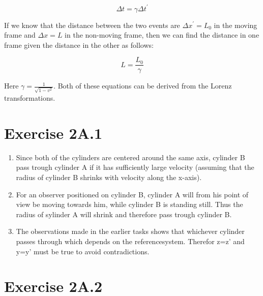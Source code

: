 \documentclass[a4paper,10pt,english]{article}
\begin{document}
\begin{equation}\label{eq:time_dila}
\Delta t=\gamma\Delta t^{\prime}
\end{equation}

If we know that the distance between the two events are $\Delta x^{\prime}=L_{0}$ in the moving frame and $\Delta x=L$ in the non-moving frame, then we can find the distance in one frame given the distance in the other as follows:

\begin{equation}\label{eq:len_con}
L=\frac{L_{0}}{\gamma}
\end{equation}

Here $\gamma=\frac{1}{\sqrt{1-v^{2}}}$. Both of these equations can be derived from the Lorenz transformations.

\newpage
%
%
%
%
%
%
%
%
\section*{Exercise 2A.1}

\begin{enumerate}
\item Since both of the cylinders are centered around the same axis, cylinder B pass trough cylinder A if it has sufficiently large velocity (assuming that the radius of cylinder B shrinks with velocity along the x-axis).
\item For an observer positioned on cylinder B, cylinder A will from his point of view be moving towards him, while  cylinder B is standing still. Thus the radius of sylinder A will shrink and therefore pass trough cylinder B.
\item The observations made in the earlier tasks shows that whichever cylinder passes through which depends on the referencesystem. Therefor z=z' and y=y' must be true to avoid contradictions.
\end{enumerate}
%
%
%
%
%
%
%
%
\section*{Exercise 2A.2}
\end{document}
